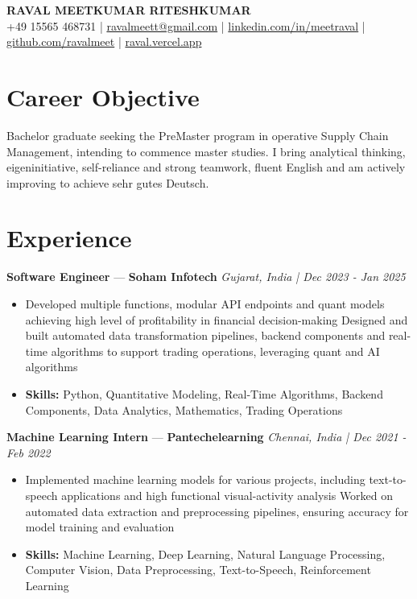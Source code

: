 \documentclass[a4paper,10pt]{article}
\begin{document}
\begin{center}
  {\Large\bfseries RAVAL MEETKUMAR RITESHKUMAR}\\[2pt]
  {\small +49 15565 468731 \;|\; \href{mailto:ravalmeett@gmail.com}{ravalmeett@gmail.com} \;|\; \href{https://www.linkedin.com/in/meetraval/}{linkedin.com/in/meetraval} \;|\; \href{https://github.com/ravalmeet}{github.com/ravalmeet} \;|\; \href{https://raval.vercel.app/}{raval.vercel.app}}
\end{center}
\vspace{-3pt}

\section*{Career Objective}
Bachelor graduate seeking the PreMaster program in operative Supply Chain Management, intending to commence master studies. I bring analytical thinking, eigeninitiative, self-reliance and strong teamwork, fluent English and am actively improving to achieve sehr gutes Deutsch.\par

\section*{Experience}
\textbf{Software Engineer} — \textbf{Soham Infotech} \hfill \textit{Gujarat, India \;|\; Dec 2023 - Jan 2025}\par
\vspace{1pt}
\begin{itemize}
  \item Developed multiple functions, modular API endpoints and quant models achieving high level of profitability in financial decision-making Designed and built automated data transformation pipelines, backend components and real-time algorithms to support trading operations, leveraging quant and AI algorithms
  \item \textbf{Skills:} Python, Quantitative Modeling, Real-Time Algorithms, Backend Components, Data Analytics, Mathematics, Trading Operations
\end{itemize}
\vspace{3pt}
\textbf{Machine Learning Intern} — \textbf{Pantechelearning} \hfill \textit{Chennai, India \;|\; Dec 2021 - Feb 2022}\par
\vspace{1pt}
\begin{itemize}
  \item Implemented machine learning models for various projects, including text-to-speech applications and high functional visual-activity analysis Worked on automated data extraction and preprocessing pipelines, ensuring accuracy for model training and evaluation
  \item \textbf{Skills:} Machine Learning, Deep Learning, Natural Language Processing, Computer Vision, Data Preprocessing, Text-to-Speech, Reinforcement Learning
\end{itemize}
\end{document}
